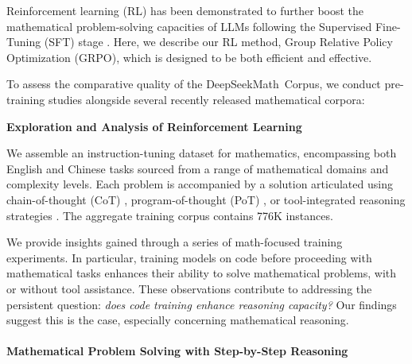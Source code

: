 Reinforcement learning (RL) has been demonstrated to further boost the mathematical problem-solving capacities of LLMs following the Supervised Fine-Tuning (SFT) stage \citep{wang2023math,wizardmath}. Here, we describe our RL method, Group Relative Policy Optimization (GRPO), which is designed to be both efficient and effective.

To assess the comparative quality of the DeepSeekMath~Corpus, we conduct pre-training studies alongside several recently released mathematical corpora:

\textbf{Exploration and Analysis of Reinforcement Learning}

We assemble an instruction-tuning dataset for mathematics, encompassing both English and Chinese tasks sourced from a range of mathematical domains and complexity levels. Each problem is accompanied by a solution articulated using chain-of-thought (CoT) \citep{cot}, program-of-thought (PoT) \citep{pot,pal}, or tool-integrated reasoning strategies \citep{tora}. The aggregate training corpus contains 776K instances.

    \item We provide insights gained through a series of math-focused training experiments. In particular, training models on code before proceeding with mathematical tasks enhances their ability to solve mathematical problems, with or without tool assistance. These observations contribute to addressing the persistent question: \textit{does code training enhance reasoning capacity?} Our findings suggest this is the case, especially concerning mathematical reasoning.

\paragraph{Mathematical Problem Solving with Step-by-Step Reasoning}

